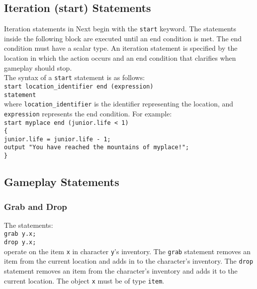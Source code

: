 \documentclass[12pt]{article}
\begin{document}
\subsection{Iteration (start) Statements}

Iteration statements in Next begin with the \texttt{start} keyword.  The statements inside the following block are executed until an end condition is met.  The end condition must have a scalar type.  An iteration statement is specified by the location in which the action occurs and an end condition that clarifies when gameplay should stop. \\

\noindent The syntax of a \texttt{start} statement is as follows: \\

\texttt{start location\_identifier end (expression)} \\
\indent \indent \texttt{statement} \\

\noindent where \texttt{location\_identifier} is the identifier representing the location, and \texttt{expression} represents the end condition.  For example: \\

\texttt{start myplace end (junior.life < 1)} \\
\indent \texttt{\{} \\
\indent \indent \texttt{junior.life = junior.life - 1;} \\
\indent \indent \texttt{output "You have reached the mountains of myplace!";} \\
\indent \texttt{\}}

\subsection{Gameplay Statements}
\subsubsection{Grab and Drop}
The statements: \\

\texttt{grab y.x;} \\
\indent \texttt{drop y.x;} \\

\noindent operate on the item \texttt{x} in character \texttt{y}'s inventory.  The \texttt{grab} statement removes an item from the current location and adds in to the character's inventory.  The \texttt{drop} statement removes an item from the character's inventory and adds it to the current location.  The object \texttt{x} must be of type \texttt{item}.
\end{document}
